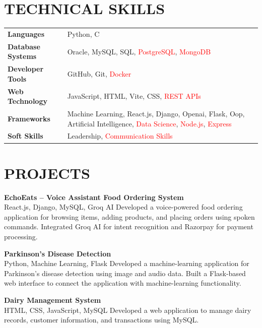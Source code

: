 \documentclass[9.5pt,a4paper]{extarticle}
\begin{document}
\section*{TECHNICAL SKILLS}
\begin{tabular}{@{}p{1.5in}p{5.4in}@{}}
\textbf{Languages} & Python, C \\
\textbf{Database Systems} & Oracle, MySQL, SQL, \textcolor{red}{PostgreSQL}, \textcolor{red}{MongoDB} \\
\textbf{Developer Tools} & GitHub, Git, \textcolor{red}{Docker} \\
\textbf{Web Technology} & JavaScript, HTML, Vite, CSS, \textcolor{red}{REST APIs} \\
\textbf{Frameworks} & Machine Learning, React.js, Django, Openai, Flask, Oop, Artificial Intelligence, \textcolor{red}{Data Science}, \textcolor{red}{Node.js}, \textcolor{red}{Express} \\
\textbf{Soft Skills} & Leadership, \textcolor{red}{Communication Skills} \\
\end{tabular}

\section*{PROJECTS}
\noindent \textbf{EchoEats – Voice Assistant Food Ordering System} \\
React.js, Django, MySQL, Groq AI Developed a voice-powered food ordering application for browsing items, adding products, and placing orders using spoken commands. Integrated Groq AI for intent recognition and Razorpay for payment processing. \vspace{4pt}

\noindent \textbf{Parkinson’s Disease Detection} \\
Python, Machine Learning, Flask Developed a machine-learning application for Parkinson’s disease detection using image and audio data. Built a Flask-based web interface to connect the application with machine-learning functionality. \vspace{4pt}

\noindent \textbf{Dairy Management System} \\
HTML, CSS, JavaScript, MySQL Developed a web application to manage dairy records, customer information, and transactions using MySQL. \vspace{4pt}


\end{document}
